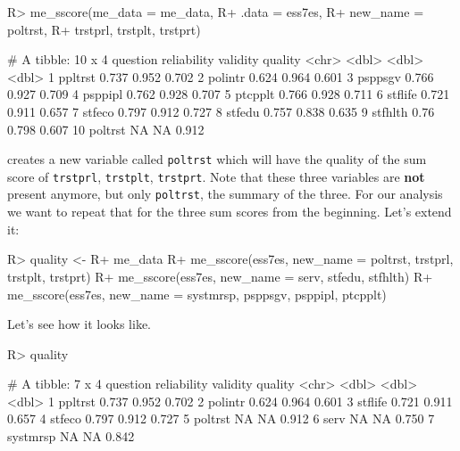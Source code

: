 \documentclass[
]{jss}
\begin{document}
\begin{CodeChunk}

\begin{CodeInput}
R> me_sscore(me_data = me_data,
R+           .data = ess7es,
R+           new_name = poltrst,
R+           trstprl, trstplt, trstprt)
\end{CodeInput}

\begin{CodeOutput}
# A tibble: 10 x 4
   question reliability validity quality
   <chr>          <dbl>    <dbl>   <dbl>
 1 ppltrst        0.737    0.952   0.702
 2 polintr        0.624    0.964   0.601
 3 psppsgv        0.766    0.927   0.709
 4 psppipl        0.762    0.928   0.707
 5 ptcpplt        0.766    0.928   0.711
 6 stflife        0.721    0.911   0.657
 7 stfeco         0.797    0.912   0.727
 8 stfedu         0.757    0.838   0.635
 9 stfhlth        0.76     0.798   0.607
10 poltrst       NA       NA       0.912
\end{CodeOutput}
\end{CodeChunk}

creates a new variable called \texttt{poltrst} which will have the
quality of the sum score of \texttt{trstprl}, \texttt{trstplt},
\texttt{trstprt}. Note that these three variables are \textbf{not}
present anymore, but only \texttt{poltrst}, the summary of the three.
For our analysis we want to repeat that for the three sum scores from
the beginning. Let's extend it:

\begin{CodeChunk}

\begin{CodeInput}
R> quality <-
R+   me_data %
R+   me_sscore(ess7es, new_name = poltrst, trstprl, trstplt, trstprt) %
R+   me_sscore(ess7es, new_name = serv, stfedu, stfhlth) %
R+   me_sscore(ess7es, new_name = systmrsp, psppsgv, psppipl, ptcpplt)
\end{CodeInput}
\end{CodeChunk}

Let's see how it looks like.

\begin{CodeChunk}

\begin{CodeInput}
R> quality
\end{CodeInput}

\begin{CodeOutput}
# A tibble: 7 x 4
  question reliability validity quality
  <chr>          <dbl>    <dbl>   <dbl>
1 ppltrst        0.737    0.952   0.702
2 polintr        0.624    0.964   0.601
3 stflife        0.721    0.911   0.657
4 stfeco         0.797    0.912   0.727
5 poltrst       NA       NA       0.912
6 serv          NA       NA       0.750
7 systmrsp      NA       NA       0.842
\end{CodeOutput}
\end{CodeChunk}
\end{document}
